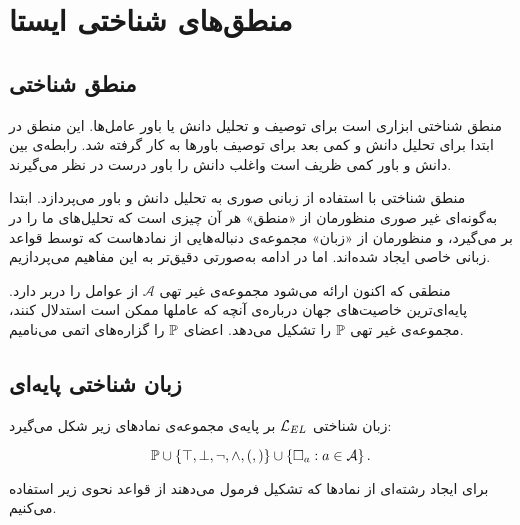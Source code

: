 \chapter{منطق‌های شناختی ایستا}

\section{منطق شناختی \texorpdfstring{ }{(EL)}}
منطق شناختی 
ابزاری است برای توصيف و تحليل دانش  يا باور  عامل‌ها. اين منطق در ابتدا برای تحليل دانش و كمی بعد برای توصيف باورها به كار گرفته شد. رابطه‌ى بین دانش
 و باور
کمی ظریف است واغلب دانش را باور درست در نظر می‌گیرند.

منطق شناختی با استفاده از زبانی صوری به تحلیل دانش و باور می‌پردازد. ابتدا به‌گونه‌ای غیر صوری منظورمان از «منطق» هر آن چیزی است که تحلیل‌های ما را در بر می‌گیرد، و منظورمان از «زبان»
مجموعه‌ی‌ دنباله‌هایی از نمادهاست که توسط قواعد زبانی خاصی ایجاد شده‌اند. اما در ادامه به‌صورتی دقیق‌تر به این مفاهیم می‌پردازیم.

منطقی که اکنون ارائه می‌شود مجموعه‌ی غیر تهی $\mathcal{A}$ از عوامل
را دربر دارد. پایه‌ای‌ترین خاصیت‌های جهان درباره‌ی آنچه که عاملها ممکن است استدلال کنند، مجموعه‌ی غیر تهی $\mathbb{P}$ را تشکیل می‌دهد. اعضای $\mathbb{P}$ را گزاره‌های اتمی می‌نامیم.

\section{زبان شناختی پایه‌ای}
زبان شناختی $ \mathcal{L}_{EL} $ بر پایه‌ی مجموعه‌ی نمادهای زیر شکل می‌گیرد:

\begin{equation*}
\mathbb{P}\cup\left\{\top,\bot,\neg,\land,(,)\right \} \cup\left\{\square_a : a\in \mathcal{A}\right\}.
\end{equation*}

برای ایجاد رشته‌ای از نمادها که تشکیل فرمول می‌دهند از قواعد نحوی زیر استفاده می‌کنیم.

